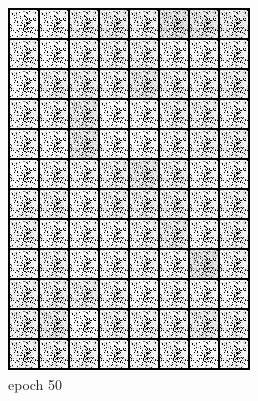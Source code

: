 \documentclass[a4paper]{article}
\theoremstyle{definition}
\newenvironment{soln}{
	\leavevmode\color{blue}\ignorespaces
}{}
\begin{document}
\begin{enumerate} [label=(\alph*)]
\begin{soln}
\begin{figure}[H]
\begin{subfigure}[b]{0.3\textwidth}
					\includegraphics[width=\textwidth]{outputs/b.gen_img50.png}
					\caption{epoch 50}
				\end{subfigure}
				\hfill
				\begin{subfigure}[b]{0.3\textwidth}
					\centering

\end{subfigure}
\end{figure}
\end{soln}
\end{enumerate}
\end{document}
